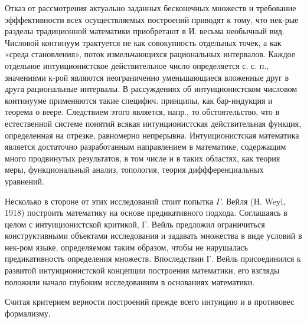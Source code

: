 \documentclass[10pt]{article}
\begin{document}
Отказ от рассмотрения актуально заданных бесконечных множеств и требование эфффективности всех осуществляемых построений приводят к тому, что нек-рые разделы традиционной математики приобретают в И. весьма необычный вид. Числовой континуум трактуется не как совокупность отдельных точек, а как «среда становления», поток измельчающихся рациональных интервалов. Каждое отдельное интуиционистское действительное число определяется с. с. п., значениями к-рой являются неограниченно уменьшающиеся вложенные друг в друга рациональные интервалы. В рассуждениях об интуиционистском числовом континууме применяются такие специфич. принципы, как бар-индукция и теорема о веере. Следствием этого является, напр., то обстоятельство, что в естественной системе понятий всякая интуиционистская действительная функция, определенная на отрезке, равномерно непрерывна. Интуиционистская математика является достаточно разработанным направлением в математике, содержащим много продвинутых результатов, в том числе и в таких областях, как теория меры, функциональный анализ, топология, теория диффференциальных уравнений.



Несколько в стороне от этих исследований стоит попытка $\Gamma$. Вейля (H. Weyl, 1918) построить математику на основе предикативного подхода. Соглашаясь в целом с интуиционистской критикой, Г. Вейль предложил ограничиться конструктивными объектами исследования и задавать множества в виде условий в нек-ром языке, определяемом таким образом, чтобы не нарушалась предикативность определения множеств. Впоследствии Г. Вейль присоединился к развитой интуиционистской концепции построения математики, его взгляды положили начало глубоким исследованиям в основаниях математики.



Считая критерием верности построений прежде всего интуицию и в противовес формализму,
\end{document}
